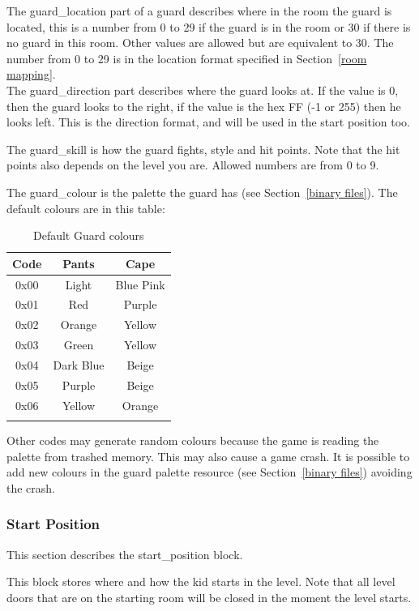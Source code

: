\documentclass{article}
\begin{document}
 The guard\_location part of a guard describes where in the room the guard
 is located, this is a number from 0 to 29 if the guard is in the room or
 30 if there is no guard in this room. Other values are allowed but are
 equivalent to 30. The number from 0 to 29 is in the location format
 specified in Section~\ref{room mapping}.\\

 The guard\_direction part describes where the guard looks at. If the value
 is 0, then the guard looks to the right, if the value is the hex FF (-1 or
 255) then he looks left. This is the direction format, and will be used in
 the start position too.

 The guard\_skill is how the guard fights, style and hit points. Note that
 the hit points also depends on the level you are. Allowed numbers are from
 0 to 9.


 The guard\_colour is the palette the guard has (see Section~\ref{binary files}).
 The default colours are in this table:

\renewcommand{\tabcolsep}{1em}
\begin{longtable}{ccc}
\hline
Code & Pants    & Cape \\
\hline
0x00 & Light    & Blue Pink \\
0x01 & Red      & Purple \\
0x02 & Orange   & Yellow \\
0x03 & Green    & Yellow \\
0x04 & Dark Blue& Beige \\
0x05 & Purple   & Beige \\
0x06 & Yellow   & Orange \\
\hline
\caption{Default Guard colours}
\label{palettes table}
\end{longtable}

 Other codes may generate random colours because the game is reading
 the palette from trashed memory. This may also cause a game crash.
 It is possible to add new colours in the guard
 palette resource (see Section~\ref{binary files}) avoiding the crash.

\subsubsection{Start Position \label{start position}} %
 This section describes the start\_position block.

 This block stores where and how the kid starts in the level. Note that all
 level doors that are on the starting room will be closed in the moment
 the level starts.
\end{document}
